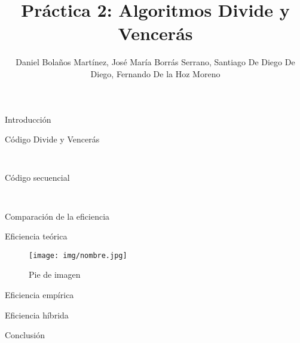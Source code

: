 \documentclass[12pt]{beamer}
\author{Daniel Bolaños Martínez, José María Borrás Serrano, Santiago De Diego De Diego, Fernando De la Hoz Moreno}
\title{Práctica 2: Algoritmos Divide y Vencerás}
\institute{ETSIIT}
\date{}
\begin{document}
\begin{frame}
\titlepage
\end{frame}

\begin{frame}
\tableofcontents
\end{frame}

\begin{frame}{Introducción}

\end{frame}

\begin{frame}[fragile]{Código Divide y Vencerás}
	\lstset{language=C, breaklines=true, basicstyle=\footnotesize}
	\begin{lstlisting}
	
	\end{lstlisting}
\end{frame}

\begin{frame}[fragile]{Código secuencial}
	\lstset{language=C, breaklines=true, basicstyle=\footnotesize}
	\begin{lstlisting}
	
	\end{lstlisting}
\end{frame}

\begin{frame}{Comparación de la eficiencia}

\begin{block}{Eficiencia teórica}
\begin{figure}[H] 
\centering
\texttt{[image: img/nombre.jpg]} 
\caption{Pie de imagen} 
\label{etiqueta} 
\end{figure}
\end{block}

\begin{block}{Eficiencia empírica}

\end{block}

\begin{block}{Eficiencia híbrida}

\end{block}

\end{frame}

\begin{frame}{Conclusión}

\end{frame}
\end{document}
